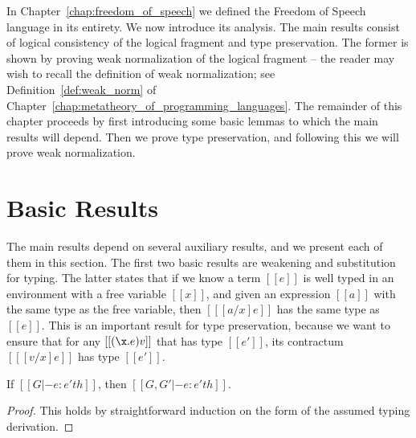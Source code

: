 In Chapter~\ref{chap:freedom_of_speech} we defined the Freedom of
Speech language in its entirety.  We now introduce its analysis.  The
main results consist of logical consistency of the logical fragment
and type preservation.  The former is shown by proving weak
normalization of the logical fragment -- the reader may wish to recall
the definition of weak normalization; see
Definition~\ref{def:weak_norm} of
Chapter~\ref{chap:metatheory_of_programming_languages}.  The remainder
of this chapter proceeds by first introducing some basic lemmas to
which the main results will depend.  Then we prove type preservation,
and following this we will prove weak normalization.

\section{Basic Results}
\label{sec:basic_results}
The main results depend on several auxiliary results, and we present
each of them in this section. The first two basic results are
weakening and substitution for typing.  The latter states that if we
know a term $[[e]]$ is well typed in an environment with a free
variable $[[x]]$, and given an expression $[[a]]$ with the same type
as the free variable, then $[[ [a/x]e]]$ has the same type as $[[e]]$.
This is an important result for type preservation, because we want to
ensure that for any $[[(\x.e) v]]$ that has type $[[e']]$, its
contractum $[[ [v/x]e]]$ has type $[[e']]$.

\begin{lemma}[Weakening]
  \label{lemma:FS-weakening}
  If $[[G |- e : e' th]]$, then $[[G, G' |- e : e' th]]$.
\end{lemma}
\begin{proof}
  This holds by straightforward induction on the form of the assumed
  typing derivation.
\end{proof}

